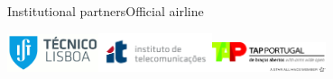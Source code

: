 \vfill{}


\noindent Institutional partners\hfill{}Official airline

\begin{center}
\quad{}\hfill{}\includegraphics[width=0.2\textwidth]{content/images/logos/ist-www}\hfill{}\includegraphics[width=0.25\textwidth]{content/images/logos/it-www}\hfill{}\includegraphics[width=0.25\textwidth]{content/images/logos/tap-www}
\par\end{center}
